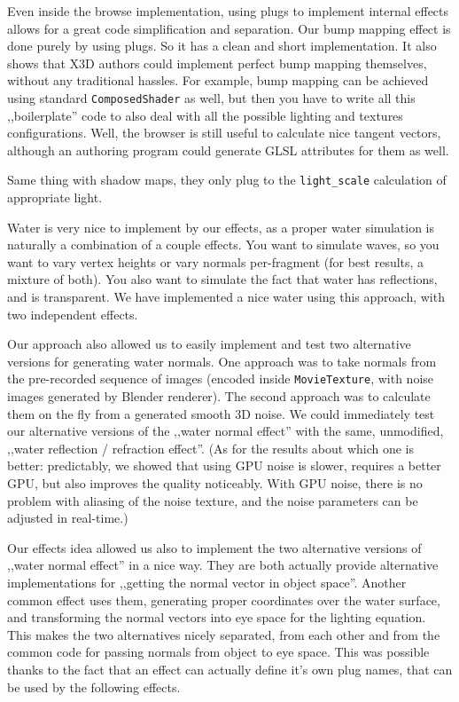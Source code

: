 \documentclass{acmsiggraph}                     %
\begin{document}
Even inside the browse implementation, using plugs to implement internal
effects allows for a great code simplification and separation.
Our bump mapping effect is done purely by using plugs.
So it has a clean and short implementation. It also shows that
X3D authors could implement perfect bump mapping themselves,
without any traditional hassles. For example, bump mapping can be
achieved using standard \texttt{ComposedShader} as well,
but then you have to write all this ,,boilerplate'' code to also deal
with all the possible lighting and textures configurations.
Well, the browser is still useful to calculate nice tangent vectors,
although an authoring program could generate GLSL attributes for them as well.

Same thing with shadow maps, they only plug to the \texttt{light\_scale}
calculation of appropriate light.

Water is very nice to implement by our effects, as a proper water simulation
is naturally a combination of a couple effects.
You want to simulate waves, so you want to vary vertex
heights or vary normals per-fragment (for best results, a mixture of both).
You also want to simulate the fact that water has reflections, and
is transparent. We have implemented a nice water using this approach,
with two independent effects.

Our approach also allowed us to easily implement and test
two alternative versions for generating water normals.
One approach was to take normals from the pre-recorded sequence of images
(encoded inside \texttt{MovieTexture},
with noise images generated by Blender renderer).
The second approach was to calculate them on the fly from
a generated smooth 3D noise. We could immediately test our alternative versions
of the ,,water normal effect'' with the same, unmodified,
,,water reflection / refraction effect''.
(As for the results about which one is better: predictably, we showed
that using GPU noise is slower, requires a better GPU,
but also improves the quality noticeably. With GPU noise, there is no problem
with aliasing of the noise texture, and the noise parameters can be adjusted
in real-time.)

Our effects idea allowed us also to implement the two alternative versions
of ,,water normal effect'' in a nice way. They are both actually provide
alternative implementations for ,,getting the normal vector in object space''.
Another common effect uses them, generating proper coordinates over
the water surface, and transforming the normal vectors into eye space for
the lighting equation. This makes the two alternatives nicely separated,
from each other and from the common code for passing normals from object to eye space.
This was possible thanks to the fact that an effect can actually define
it's own plug names, that can be used by the following effects.
\end{document}
